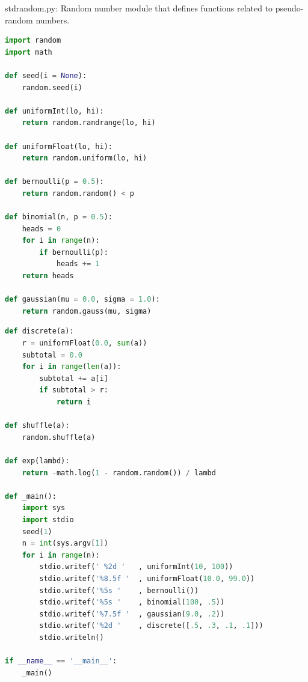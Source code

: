 \documentclass[8pt,a4paper,compress]{beamer}
\begin{document}
\begin{frame}[fragile]
\pause

\begin{framed}
\tiny stdrandom.py: Random number module that defines functions related to pseudo-random numbers.
\end{framed}

\begin{lstlisting}[language=Python,style=focusin]
import random
import math

def seed(i = None):
    random.seed(i)

def uniformInt(lo, hi):
    return random.randrange(lo, hi)
    
def uniformFloat(lo, hi):
    return random.uniform(lo, hi)

def bernoulli(p = 0.5):
    return random.random() < p

def binomial(n, p = 0.5):
    heads = 0
    for i in range(n):
        if bernoulli(p):
            heads += 1
    return heads
    
def gaussian(mu = 0.0, sigma = 1.0):
    return random.gauss(mu, sigma)
\end{lstlisting}
\end{frame}

\begin{frame}[fragile]
\pause

\begin{lstlisting}[language=Python,style=focusin]
def discrete(a):
    r = uniformFloat(0.0, sum(a))
    subtotal = 0.0
    for i in range(len(a)):
        subtotal += a[i]
        if subtotal > r:
            return i

def shuffle(a):
    random.shuffle(a)

def exp(lambd):
    return -math.log(1 - random.random()) / lambd
    
def _main():
    import sys
    import stdio
    seed(1)
    n = int(sys.argv[1])
    for i in range(n):
        stdio.writef(' %2d '   , uniformInt(10, 100))
        stdio.writef('%8.5f '  , uniformFloat(10.0, 99.0))
        stdio.writef('%5s '    , bernoulli())
        stdio.writef('%5s '    , binomial(100, .5))
        stdio.writef('%7.5f '  , gaussian(9.0, .2))
        stdio.writef('%2d '    , discrete([.5, .3, .1, .1]))
        stdio.writeln()

if __name__ == '__main__':
    _main()
\end{lstlisting}
\end{frame}
\end{document}
